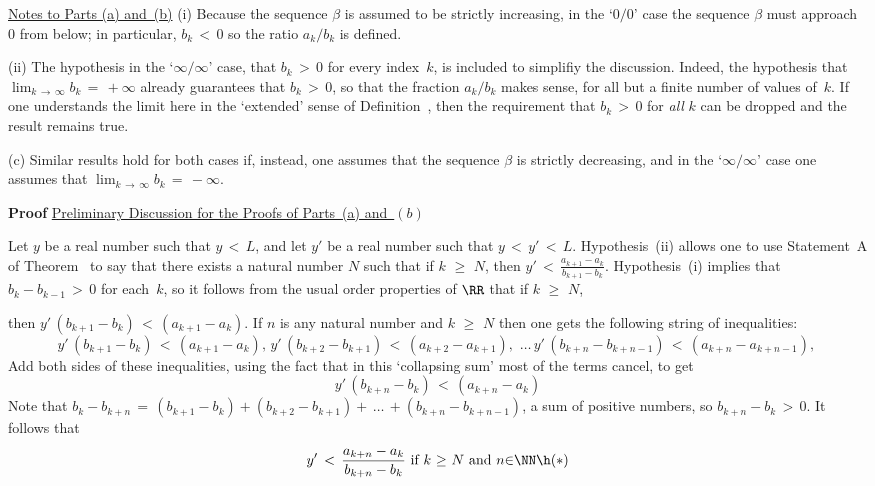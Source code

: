         \underline{Notes to Parts (a) and~(b)} (i) Because the sequence ${\beta}$ is assumed to be strictly increasing,
    in the `$0/0$' case the sequence ${\beta}$ must approach~$0$ from below; in particular, $b_{k}\,<\,0$ so the ratio $a_{k}/b_{k}$ is defined.

        (ii) The hypothesis in the `${\infty}/{\infty}$' case, that $b_{k}\,>\,0$ for every index~$k$, is included to simplifiy the discussion.
    Indeed, the hypothesis that $\lim_{k \,{\rightarrow}\, {\infty}} b_{k} \,=\, +{\infty}$ already guarantees that $b_{k}\,>\,0$,
    so that the fraction $a_{k}/b_{k}$ makes sense, for all but a finite number of values of~$k$.
    If one understands the limit here in the `extended' sense of Definition~,
    then the requirement that $b_{k}\,>\,0$ for {\em all} $k$ can be dropped and the result remains true.

\V

        (c) Similar results hold for both cases if, instead,
    one assumes that the sequence ${\beta}$ is strictly decreasing,
        and in the `${\infty}/{\infty}$' case one assumes that $\lim_{k \,{\rightarrow}\, {\infty}} b_{k} \,=\, -{\infty}$.

\V

        {\bf Proof} \underline{Preliminary Discussion for the Proofs of Parts~(a) and~$(b)$}

        Let $y$ be a real number such that $y\,<\,L$, and let $y'$ be a real number such that $y\,<\,y'\,<\,L$.
    Hypothesis~(ii) allows one to use Statement~A of Theorem~ to say that there exists a natural number $N$ such that if $k\,\,{\geq}\,\,N$,
    then ${\displaystyle y'\,<\,\frac{a_{k+1}-a_{k}}{b_{k+1}-b_{k}}}$. Hypothesis~(i) implies that $b_{k} - b_{k-1}\,>\,0$ for each~$k$,
     so it follows from the usual order properties of ${\RR}$ that if $k\,\,{\geq}\,\,N$,

    then $y'\,(b_{k+1}-b_{k})\,<\,(a_{k+1}-a_{k})$. If $n$ is any natural number and $k\,\,{\geq}\,\,N$ then one gets the following string of inequalities:
        \begin{displaymath}
        y'\,(b_{k+1}-b_{k})\,<\,(a_{k+1}-a_{k}), \,
        y'\,(b_{k+2}-b_{k+1})\,<\,(a_{k+2}-a_{k+1}), \,
        \,{\ldots}\,
        y'\,(b_{k+n}-b_{k+n-1})\,<\,(a_{k+n}-a_{k+n-1}), \,
        \end{displaymath}
    Add both sides of these inequalities, using the fact that in this `collapsing sum' most of the terms cancel, to get
        \begin{displaymath}
        y'\,(b_{k+n} - b_{k})\,<\,(a_{k+n} - a_{k})
        \end{displaymath}
    Note that $b_{k}-b_{k+n} \,=\, (b_{k+1}-b_{k}) + (b_{k+2} - b_{k+1}) + \,{\ldots}\,+ (b_{k+n} - b_{k+n-1})$,
    a sum of positive numbers, so $b_{k+n}-b_{k}\,>\,0$. It follows that
        \begin{displaymath}
        y' \,<\,\frac{a_{k+n}-a_{k}}{b_{k+n}-b_{k}} \mbox{ if $k\,\,{\geq}\,\,N$ and $n{\in}{\NN}$} \h ({\ast})
        \end{displaymath}

